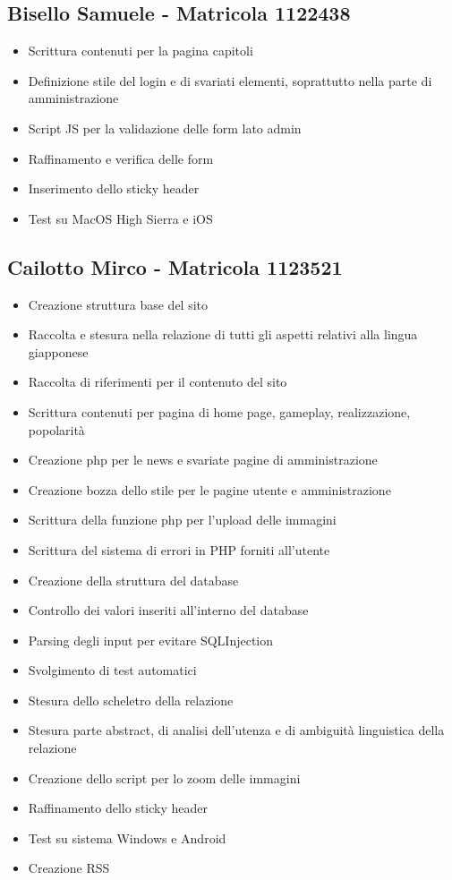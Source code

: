 \documentclass[openany, a4paper, 12pt]{report}
\begin{document}
	\subsection{Bisello Samuele - Matricola 1122438}
	\begin{itemize}
		\item Scrittura contenuti per la pagina capitoli
		\item Definizione stile del login e di svariati elementi, soprattutto nella parte di amministrazione
		\item Script JS per la validazione delle form lato admin
		\item Raffinamento e verifica delle form
		\item Inserimento dello sticky header
		\item Test su MacOS High Sierra e iOS
	\end{itemize}
	\subsection{Cailotto Mirco - Matricola 1123521}
	\begin{itemize}
		\item Creazione struttura base del sito
		\item Raccolta e stesura nella relazione di tutti gli aspetti relativi alla lingua giapponese
		\item Raccolta di riferimenti per il contenuto del sito
		\item Scrittura contenuti per pagina di home page, gameplay, realizzazione, popolarità
		\item Creazione php per le news e svariate pagine di amministrazione
		\item Creazione bozza dello stile per le pagine utente e amministrazione
		\item Scrittura della funzione php per l'upload delle immagini
		\item Scrittura del sistema di errori in PHP forniti all'utente
		\item Creazione della struttura del database
		\item Controllo dei valori inseriti all'interno del database
		\item Parsing degli input per evitare SQLInjection
		\item Svolgimento di test automatici
		\item Stesura dello scheletro della relazione
		\item Stesura parte abstract, di analisi dell'utenza e di ambiguità linguistica della relazione
		\item Creazione dello script per lo zoom delle immagini
		\item Raffinamento dello sticky header
		\item Test su sistema Windows e Android
		\item Creazione RSS
	\end{itemize}
\end{document}
